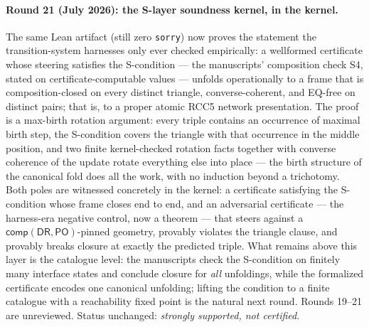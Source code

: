 \documentclass[
]{ceurart}
\theoremstyle{definition}
\newcommand{\DR}{\ensuremath{\mathsf{DR}}}
\newcommand{\PO}{\ensuremath{\mathsf{PO}}}
\newcommand{\comp}{\ensuremath{\mathsf{comp}}}
\begin{document}
\paragraph{Round 21 (July 2026): the S-layer soundness kernel, in the
kernel.}
The same Lean artifact (still zero \texttt{sorry}) now proves the
statement the transition-system harnesses only ever checked
empirically: a wellformed certificate whose steering satisfies the
S-condition --- the manuscripts' composition check S4, stated on
certificate-computable values --- unfolds operationally to a frame
that is composition-closed on every distinct triangle,
converse-coherent, and EQ-free on distinct pairs; that is, to a proper
atomic RCC5 network presentation.  The proof is a max-birth rotation
argument: every triple contains an occurrence of maximal birth step,
the S-condition covers the triangle with that occurrence in the middle
position, and two finite kernel-checked rotation facts together with
converse coherence of the update rotate everything else into place ---
the birth structure of the canonical fold does all the work, with no
induction beyond a trichotomy.  Both poles are witnessed concretely in
the kernel: a certificate satisfying the S-condition whose frame
closes end to end, and an adversarial certificate --- the harness-era
negative control, now a theorem --- that steers against a
$\comp(\DR,\PO)$-pinned geometry, provably violates the triangle
clause, and provably breaks closure at exactly the predicted triple.
What remains above this layer is the catalogue level: the manuscripts
check the S-condition on finitely many interface states and conclude
closure for \emph{all} unfoldings, while the formalized certificate
encodes one canonical unfolding; lifting the condition to a finite
catalogue with a reachability fixed point is the natural next round.
Rounds 19--21 are unreviewed.  Status unchanged: \emph{strongly
supported, not certified}.
\end{document}

